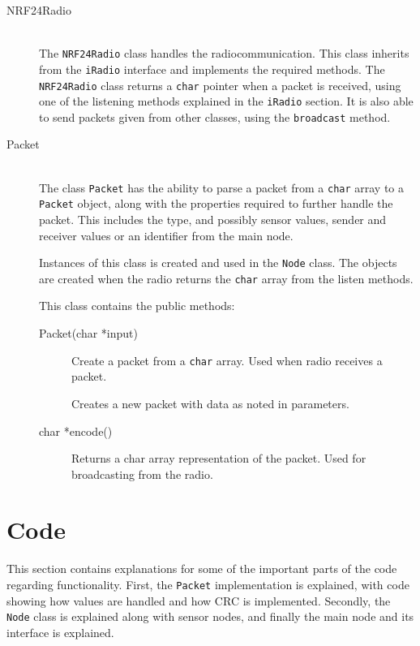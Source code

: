 \begin{description}
\item[NRF24Radio] \hfill \\
The \texttt{NRF24Radio} class handles the radiocommunication. This class inherits from the \texttt{iRadio} interface and implements the required methods. The \texttt{NRF24Radio} class returns a \texttt{char} pointer when a packet is received, using one of the listening methods explained in the \texttt{iRadio} section. It is also able to send packets given from other classes, using the \texttt{broadcast} method.

\item[Packet] \hfill \\
The class \texttt{Packet} has the ability to parse a packet from a \texttt{char} array to a \texttt{Packet} object, along with the properties required to further handle the packet. This includes the type, and possibly sensor values, sender and receiver values or an identifier from the main node.

Instances of this class is created and used in the \texttt{Node} class. The objects are created when the radio returns the \texttt{char} array from the listen methods.

This class contains the public methods:
\begin{description}
\item[Packet(char *input)] Create a packet from a \texttt{char} array. Used when radio receives a packet.
\item[{\parbox[t]{0.6\linewidth}{Packet(PacketType packetTypeInput, \\ uint16\_t addresserInput, \\ uint16\_t addresseeInput, \\ uint16\_t originInput, \\ uint16\_t value1Input, \\ uint16\_t value2Input, \\ uint16\_t value3Input)}}] \item[] Creates a new packet with data as noted in parameters.
\item[char *encode()] Returns a char array representation of the packet. Used for broadcasting from the radio.
\end{description}

\end{description}


\section{Code}
This section contains explanations for some of the important parts of the code regarding functionality. First, the \texttt{Packet} implementation is explained, with code showing how values are handled and how CRC is implemented. Secondly, the \texttt{Node} class is explained along with sensor nodes, and finally the main node and its interface is explained.



